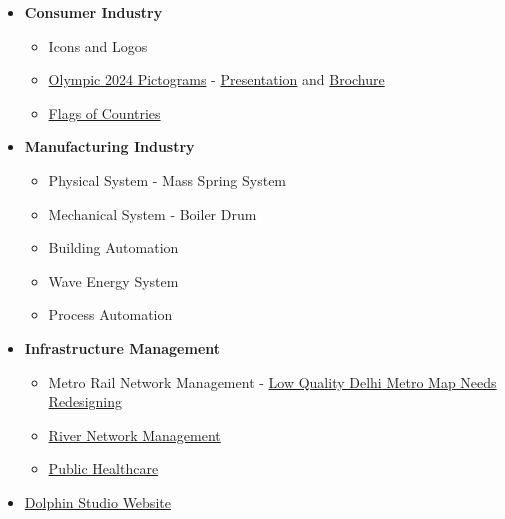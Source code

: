 \documentclass{ammTalk}
\begin{document}
\begin{itemize}[itemsep=6mm]\LARGE
\item \textbf{Consumer Industry}
\begin{itemize}\Large
\item Icons and Logos
\item \href{http://54.205.5.132:3000/demo-pub-branding.html}{Olympic 2024 Pictograms} - \href{http://54.205.5.132:3000/pst-icon-sports-olympic-2024-talk.pdf}{Presentation} and \href{http://54.205.5.132:3000/pst-icon-sports-olympic-2024.pdf}{Brochure}
\item \href{https://ctan.org/pkg/pst-flags?lang=en}{Flags of Countries}
\end{itemize}
\item \textbf{Manufacturing Industry}
\begin{itemize}\Large
\item Physical System - Mass Spring System
\item Mechanical System - Boiler Drum
\item Building Automation
\item Wave Energy System
\item Process Automation
\end{itemize}
\item \textbf{Infrastructure Management}
\begin{itemize}\Large
\item Metro Rail Network Management - \href{https://backend.delhimetrorail.com/documents/1030/smartcard.pdf}{Low Quality Delhi Metro Map Needs Redesigning}
\item \href{http://54.205.5.132:3000/pst-icons-river-krishna.pdf}{River Network Management}
\item \href{https://bapfoundation.org/}{Public Healthcare}
\end{itemize}
\item \href{http://54.205.5.132:3000/}{Dolphin Studio Website}
\end{itemize}
\clearpage
\pagestyle{contact}
\end{document}
